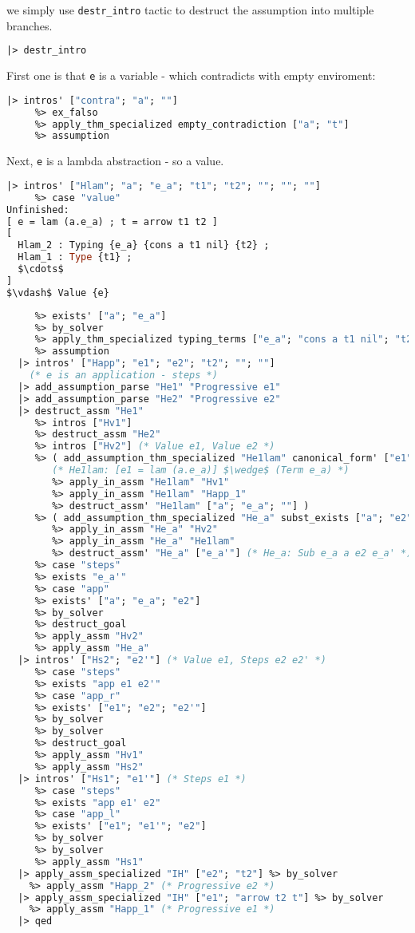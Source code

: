 \documentclass[english, mgr]{iithesis}
\renewcommand{\tt}[1]{\texttt{\small{#1}}}
\begin{document}
we simply use \tt{{destr\_intro}} tactic to destruct the assumption into multiple branches.
\begin{lstlisting}[language=OCaml]
  |> destr_intro
\end{lstlisting}
First one is that \tt{e} is a variable - which contradicts with empty enviroment:
\begin{lstlisting}[language=OCaml]
  |> intros' ["contra"; "a"; ""]
     %> ex_falso
     %> apply_thm_specialized empty_contradiction ["a"; "t"]
     %> assumption
\end{lstlisting}
Next, \tt{e} is a lambda abstraction - so a value.
\begin{lstlisting}[mathescape, language=OCaml]
  |> intros' ["Hlam"; "a"; "e_a"; "t1"; "t2"; ""; ""; ""]
     %> case "value"
Unfinished:
[ e = lam (a.e_a) ; t = arrow t1 t2 ]
[
  Hlam_2 : Typing {e_a} {cons a t1 nil} {t2} ;
  Hlam_1 : Type {t1} ;
  $\cdots$
]
$\vdash$ Value {e}
\end{lstlisting}
\begin{lstlisting}[mathescape,language=OCaml]
     %> case "lam"
     %> exists' ["a"; "e_a"]
     %> by_solver
     %> apply_thm_specialized typing_terms ["e_a"; "cons a t1 nil"; "t2"]
     %> assumption
  |> intros' ["Happ"; "e1"; "e2"; "t2"; ""; ""]
    (* e is an application - steps *)
  |> add_assumption_parse "He1" "Progressive e1"
  |> add_assumption_parse "He2" "Progressive e2"
  |> destruct_assm "He1"
     %> intros ["Hv1"]
     %> destruct_assm "He2"
     %> intros ["Hv2"] (* Value e1, Value e2 *)
     %> ( add_assumption_thm_specialized "He1lam" canonical_form' ["e1"; "t2"; "t"]
        (* He1lam: [e1 = lam (a.e_a)] $\wedge$ (Term e_a) *)
        %> apply_in_assm "He1lam" "Hv1"
        %> apply_in_assm "He1lam" "Happ_1"
        %> destruct_assm' "He1lam" ["a"; "e_a"; ""] )
     %> ( add_assumption_thm_specialized "He_a" subst_exists ["a"; "e2"; "e_a"]
        %> apply_in_assm "He_a" "Hv2"
        %> apply_in_assm "He_a" "He1lam"
        %> destruct_assm' "He_a" ["e_a'"] (* He_a: Sub e_a a e2 e_a' *) )
     %> case "steps"
     %> exists "e_a'"
     %> case "app"
     %> exists' ["a"; "e_a"; "e2"]
     %> by_solver
     %> destruct_goal
     %> apply_assm "Hv2"
     %> apply_assm "He_a"
  |> intros' ["Hs2"; "e2'"] (* Value e1, Steps e2 e2' *)
     %> case "steps"
     %> exists "app e1 e2'"
     %> case "app_r"
     %> exists' ["e1"; "e2"; "e2'"]
     %> by_solver
     %> by_solver
     %> destruct_goal
     %> apply_assm "Hv1"
     %> apply_assm "Hs2"
  |> intros' ["Hs1"; "e1'"] (* Steps e1 *)
     %> case "steps"
     %> exists "app e1' e2"
     %> case "app_l"
     %> exists' ["e1"; "e1'"; "e2"]
     %> by_solver
     %> by_solver
     %> apply_assm "Hs1"
  |> apply_assm_specialized "IH" ["e2"; "t2"] %> by_solver
    %> apply_assm "Happ_2" (* Progressive e2 *)
  |> apply_assm_specialized "IH" ["e1"; "arrow t2 t"] %> by_solver
    %> apply_assm "Happ_1" (* Progressive e1 *)
  |> qed
\end{lstlisting}
\end{document}
